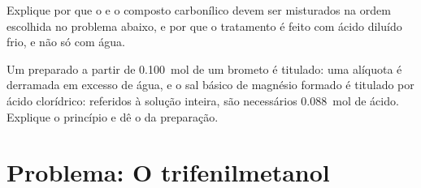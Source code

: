 \begin{exercise}[$\star\star\star$]\label{exo:b1:organomagnesium:11}
Explique por que o  e o composto carbonílico devem
ser misturados na ordem escolhida no problema abaixo, e por que o
tratamento é feito com ácido diluído frio, e não só com água.
\end{exercise}

\begin{exercise}[$\star\star\star$]\label{exo:b1:organomagnesium:12}
Um  preparado a partir de \qty{0.100}{mol} de um
brometo é titulado: uma alíquota é derramada em excesso de água, e o sal
básico de magnésio formado é titulado por ácido clorídrico: referidos à
solução inteira, são necessários \qty{0.088}{mol} de ácido. Explique o
princípio e dê o  da preparação.
\end{exercise}

\section{Problema: O trifenilmetanol}

